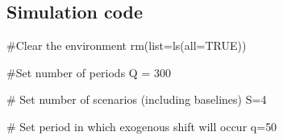 \documentclass[
  letterpaper,
  DIV=11,
  numbers=noendperiod]{scrreprt}
\newenvironment{Shaded}{\begin{snugshade}}{\end{snugshade}}
\newcommand{\AttributeTok}[1]{\textcolor[rgb]{0.40,0.45,0.13}{#1}}
\newcommand{\CommentTok}[1]{\textcolor[rgb]{0.37,0.37,0.37}{#1}}
\newcommand{\ConstantTok}[1]{\textcolor[rgb]{0.56,0.35,0.01}{#1}}
\newcommand{\DecValTok}[1]{\textcolor[rgb]{0.68,0.00,0.00}{#1}}
\newcommand{\FunctionTok}[1]{\textcolor[rgb]{0.28,0.35,0.67}{#1}}
\newcommand{\NormalTok}[1]{\textcolor[rgb]{0.00,0.23,0.31}{#1}}
\newcommand{\OtherTok}[1]{\textcolor[rgb]{0.00,0.23,0.31}{#1}}
\begin{document}
\subsection{Simulation code}\label{simulation-code-7}

\begin{Shaded}
\begin{Highlighting}[]
\CommentTok{\#Clear the environment}
\FunctionTok{rm}\NormalTok{(}\AttributeTok{list=}\FunctionTok{ls}\NormalTok{(}\AttributeTok{all=}\ConstantTok{TRUE}\NormalTok{))}

\CommentTok{\#Set number of periods}
\NormalTok{Q }\OtherTok{=} \DecValTok{300}

\CommentTok{\# Set number of scenarios (including baselines)}
\NormalTok{S}\OtherTok{=}\DecValTok{4}

\CommentTok{\# Set period in which exogenous shift will occur}
\NormalTok{q}\OtherTok{=}\DecValTok{50}


\end{Highlighting}
\end{Shaded}
\end{document}
